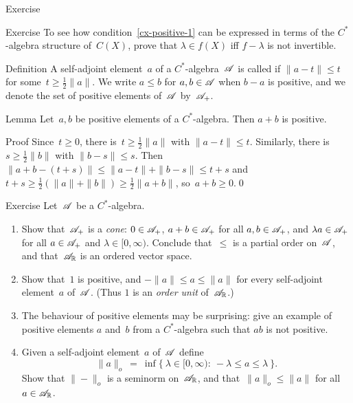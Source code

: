 \documentclass[main]{subfiles}
\begin{document}
\begin{parsec}
\begin{point}[cx-positive]{Exercise}
\begin{enumerate}
\end{enumerate}
\begin{point}{Exercise}%
To see how condition~\ref{cx-positive-1}
can be expressed in terms of the $C^*$-algebra structure of~$C(X)$,
prove that  $\lambda\in f(X)$ iff $f-\lambda$
is not invertible.
\end{point}
\end{point}
\begin{point}{Definition}%
A self-adjoint element~$a$ of a $C^*$-algebra~$\mathscr{A}$ is called
 if $\|a-t\|\leq t$
for some~$t\geq \frac{1}{2}\|a\|$.
We write $a\leq b$ for $a,b\in\mathscr{A}$ when $b-a$ is positive,
and we denote the set of positive elements of~$\mathscr{A}$
by~$\mathscr{A}_{+}$.
\end{point}
\begin{point}{Lemma}%
Let~$a,b$ be positive elements of a $C^*$-algebra.
Then $a+b$ is positive.
\begin{point}{Proof}
Since~$t\geq 0$,
there is~$t\geq \frac{1}{2}\|a\|$ with $\|a-t\|\leq t$.
Similarly, there is~$s\geq \frac{1}{2}\|b\|$
with $\|b-s\|\leq s$.
Then $\|a+b-(t+s)\|\leq \|a-t\|+\|b-s\|\leq t+s$
and $t+s\geq \frac{1}{2}(\|a\|+\|b\|) \geq \frac{1}{2}\|a+b\|$,
so~$a+b\geq 0$.\qed
\end{point}
\end{point}
\begin{point}{Exercise}%
Let~$\mathscr{A}$ be a $C^*$-algebra.
\begin{enumerate}
\item
Show that~$\mathscr{A}_{+}$ is a \emph{cone}:
$0\in \mathscr{A}_{+}$,
$a+b\in \mathscr{A}_{+}$ for all $a,b\in\mathscr{A}_{+}$,
and
$\lambda a\in \mathscr{A}_{+}$  
for all $a\in \mathscr{A}_{+}$ and $\lambda\in [0,\infty)$.
Conclude that~$\leq$ is a partial order on~$\mathscr{A}$,
and that~$\mathscr{A}_{\mathbb{R}}$ is an ordered vector space.
\item
Show that~$1$ is positive, and  $-\|a\|\leq a \leq \|a\|$
for every self-adjoint element~$a$ of~$\mathscr{A}$.
(Thus $1$ is an \emph{order unit} of~$\mathscr{A}_{\mathbb{R}}$.)
\item
The behaviour of positive elements may be surprising:
give an example of positive elements $a$ and~$b$
from a $C^*$-algebra
such that $ab$ is not positive.
\item
Given a self-adjoint element~$a$ of~$\mathscr{A}$ define
\begin{equation*}
\|a\|_o \ = \ \inf\{\ \lambda\in[0,\infty)\colon \ 
-\lambda\leq a\leq \lambda\ \}.
\end{equation*}
Show that $\|-\|_o$ is a seminorm on~$\mathscr{A}_{\mathbb{R}}$,
and that~$\|a\|_o\leq \|a\|$
for all~$a\in\mathscr{A}_{\mathbb{R}}$.


\end{enumerate}
\end{point}
\end{parsec}
\end{document}
